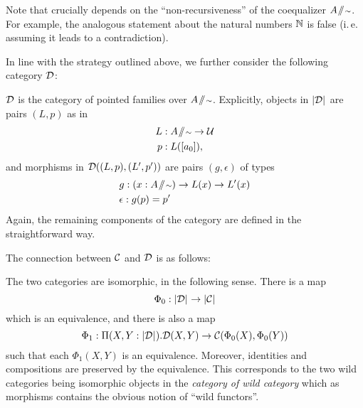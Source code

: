 \begin{remark}
Note that  crucially depends on the ``non-recur\-siveness''
of the coequalizer $A \! \sslash \! {\scriptstyle \sim}$.
For example, the analogous statement about the natural numbers $\mathbb{N}$ is false
(i.\,e. assuming it leads to a contradiction).
\end{remark}

In line with the strategy outlined above, we further consider the following
category $\mathcal D$:
\begin{defn}\label{def:paths-catD}
 $\mathcal D$ is the category of pointed families over $A \! \sslash \! {\scriptstyle \sim}$.
 Explicitly, objects in $\mathopen{}\left|\mathcal D\right|_{}^{}\mathclose{}$ are pairs $(L,p)$ as in
 \begin{align*}
  L &: A \! \sslash \! {\scriptstyle \sim} \to \mathcal{U} \\
  p &: L([a_0]),
 \end{align*}
 and morphisms in $\mathcal D((L,p), (L',p'))$ are pairs $(g,\epsilon)$ of types 
 \begin{align}
  & g : (x : A \! \sslash \! {\scriptstyle \sim}) \to L(x) \to L'(x) \label{eq:D0-morph-g}  \\
  & \epsilon : g(p) = p' \label{eq:D0-morph-e}
 \end{align}
 Again, the remaining components of the category are defined in the straightforward way.
\end{defn}

The connection between $\mathcal C$ and $\mathcal D$ is as follows:
\begin{lemma} \label{lem:paths-cats-are-iso}
 The two categories are isomorphic, in the following sense.
 There is a map
 \begin{equation} \label{eq:Phi0-folded}
  \Phi_0 : \mathopen{}\left|\mathcal D\right|_{}^{}\mathclose{} \to \mathopen{}\left|\mathcal C\right|_{}^{}\mathclose{}
 \end{equation}
 which is an equivalence, and there is also a map
 \begin{equation} \label{eq:Phi1-folded}
  \Phi_1 : \Pi (X,Y : \mathopen{}\left|\mathcal D\right|_{}^{}\mathclose{}). \mathcal D(X,Y) \to \mathcal C(\Phi_0(X),\Phi_0(Y))
 \end{equation}
 such that each $\Phi_1(X,Y)$ is an equivalence.
 Moreover, identities and compositions are preserved by the equivalence.
 This corresponds to the two wild categories being isomorphic objects in the
 \emph{category of wild category} which as morphisms contains the obvious notion
 of ``wild functors''.
\end{lemma}

